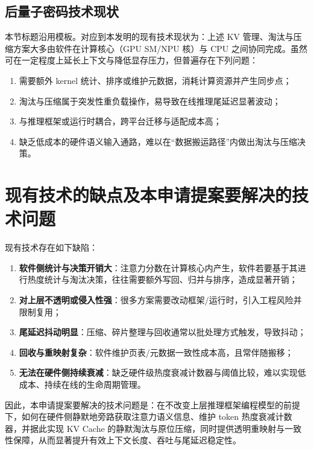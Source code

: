 \documentclass[12pt,a4paper]{article}
\begin{document}
\subsection{后量子密码技术现状}

本节标题沿用模板。对应到本发明的现有技术现状为：上述 KV 管理、淘汰与压缩方案大多由软件在计算核心（GPU SM/NPU 核）与 CPU 之间协同完成。虽然可在一定程度上延长上下文与降低显存压力，但普遍存在下列问题：
\begin{enumerate}
    \item 需要额外 kernel 统计、排序或维护元数据，消耗计算资源并产生同步点；
    \item 淘汰与压缩属于突发性重负载操作，易导致在线推理尾延迟显著波动；
    \item 与推理框架或运行时耦合，跨平台迁移与适配成本高；
    \item 缺乏低成本的硬件语义输入通路，难以在“数据搬运路径”内做出淘汰与压缩决策。
\end{enumerate}

\section{现有技术的缺点及本申请提案要解决的技术问题}

现有技术存在如下缺陷：

\begin{enumerate}
    \item \textbf{软件侧统计与决策开销大}：注意力分数在计算核心内产生，软件若要基于其进行热度统计与淘汰决策，往往需要额外写回、归并与排序，造成显著开销；
    \item \textbf{对上层不透明或侵入性强}：很多方案需要改动框架/运行时，引入工程风险并限制复用；
    \item \textbf{尾延迟抖动明显}：压缩、碎片整理与回收通常以批处理方式触发，导致抖动；
    \item \textbf{回收与重映射复杂}：软件维护页表/元数据一致性成本高，且常伴随搬移；
    \item \textbf{无法在硬件侧持续衰减}：缺乏硬件级热度衰减计数器与阈值比较，难以实现低成本、持续在线的生命周期管理。
\end{enumerate}

因此，本申请提案要解决的技术问题是：在不改变上层推理框架编程模型的前提下，如何在硬件侧静默地旁路获取注意力语义信息、维护 token 热度衰减计数器，并据此实现 KV Cache 的静默淘汰与原位压缩，同时提供透明重映射与一致性保障，从而显著提升有效上下文长度、吞吐与尾延迟稳定性。
\end{document}
